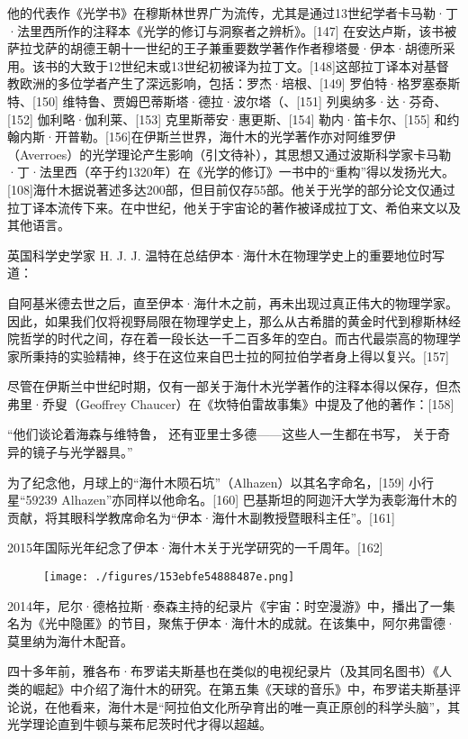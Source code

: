他的代表作《光学书》在穆斯林世界广为流传，尤其是通过13世纪学者卡马勒·丁·法里西所作的注释本《光学的修订与洞察者之辨析》。[147] 在安达卢斯，该书被萨拉戈萨的胡德王朝十一世纪的王子兼重要数学著作作者穆塔曼·伊本·胡德所采用。该书的大致于12世纪末或13世纪初被译为拉丁文。[148]这部拉丁译本对基督教欧洲的多位学者产生了深远影响，包括：罗杰·培根、[149] 罗伯特·格罗塞泰斯特、[150] 维特鲁、贾姆巴蒂斯塔·德拉·波尔塔（、[151] 列奥纳多·达·芬奇、[152] 伽利略·伽利莱、[153] 克里斯蒂安·惠更斯、[154] 勒内·笛卡尔、[155] 和约翰内斯·开普勒。[156]在伊斯兰世界，海什木的光学著作亦对阿维罗伊（Averroes）的光学理论产生影响（引文待补），其思想又通过波斯科学家卡马勒·丁·法里西（卒于约1320年）在《光学的修订》一书中的“重构”得以发扬光大。[108]海什木据说著述多达200部，但目前仅存55部。他关于光学的部分论文仅通过拉丁译本流传下来。在中世纪，他关于宇宙论的著作被译成拉丁文、希伯来文以及其他语言。

英国科学史学家 H. J. J. 温特在总结伊本·海什木在物理学史上的重要地位时写道：

自阿基米德去世之后，直至伊本·海什木之前，再未出现过真正伟大的物理学家。因此，如果我们仅将视野局限在物理学史上，那么从古希腊的黄金时代到穆斯林经院哲学的时代之间，存在着一段长达一千二百多年的空白。而古代最崇高的物理学家所秉持的实验精神，终于在这位来自巴士拉的阿拉伯学者身上得以复兴。[157]

尽管在伊斯兰中世纪时期，仅有一部关于海什木光学著作的注释本得以保存，但杰弗里·乔叟（Geoffrey Chaucer）在《坎特伯雷故事集》中提及了他的著作：[158]

“他们谈论着海森与维特鲁，
还有亚里士多德——这些人一生都在书写，
关于奇异的镜子与光学器具。”

为了纪念他，月球上的“海什木陨石坑”（Alhazen）以其名字命名，[159] 小行星“59239 Alhazen”亦同样以他命名。[160] 巴基斯坦的阿迦汗大学为表彰海什木的贡献，将其眼科学教席命名为“伊本·海什木副教授暨眼科主任”。[161]

2015年国际光年纪念了伊本·海什木关于光学研究的一千周年。[162]
\begin{figure}[ht]
\centering
\texttt{[image: ./figures/153ebfe54888487e.png]}
\caption{} \label{fig_YBH_6}
\end{figure}
2014年，尼尔·德格拉斯·泰森主持的纪录片《宇宙：时空漫游》中，播出了一集名为《光中隐匿》的节目，聚焦于伊本·海什木的成就。在该集中，阿尔弗雷德·莫里纳为海什木配音。

四十多年前，雅各布·布罗诺夫斯基也在类似的电视纪录片（及其同名图书）《人类的崛起》中介绍了海什木的研究。在第五集《天球的音乐》中，布罗诺夫斯基评论说，在他看来，海什木是“阿拉伯文化所孕育出的唯一真正原创的科学头脑”，其光学理论直到牛顿与莱布尼茨时代才得以超越。

